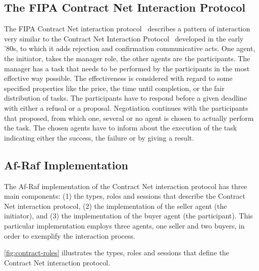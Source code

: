 \documentclass[a4paper,12pt,oneside,fleqn]{book} %
\begin{document}
\subsection{The FIPA Contract Net Interaction Protocol} %
The FIPA Contract Net interaction protocol~\cite{web:fipa} describes a
pattern of interaction very similar to the Contract Net Interaction
Protocol~\cite{DBLP:journals/tc/Smith80a} developed in the early
'80s, to which it adds rejection and confirmation communicative acts. One
agent, the initiator, takes the manager role, the other agents are the
participants. The manager has a task that needs to be performed by the
participants in the most effective way possible. The effectiveness is
considered with regard to some specified properties like the price, the
time until completion, or the fair distribution of tasks. The participants
have to respond before a given deadline with either a refusal or a proposal.
Negotiation continues with the participants that proposed, from which one,
several or no agent is chosen to actually perform the task. The chosen
agents have to inform about the execution of the task indicating either the
success, the failure or by giving a result.
\subsection{Af-Raf Implementation} %
The Af-Raf implementation of the Contract Net interaction protocol has
three main components: (1) the types, roles and sessions that describe the
Contract Net interaction protocol, (2) the implementation of the seller
agent (the initiator), and (3) the implementation of the buyer agent (the
participant). This particular implementation employs three agents, one
seller and two buyers, in order to exemplify the interaction process.

\autoref{fig:contract-roles} illustrates the types, roles and sessions that
define the Contract Net interaction protocol.
\end{document}
